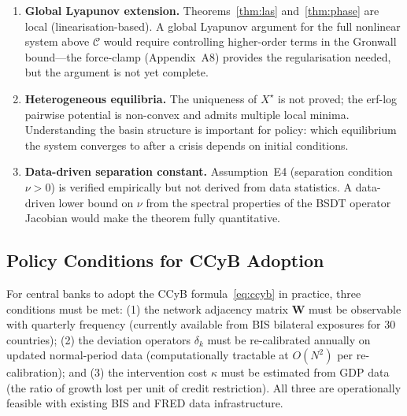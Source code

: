 \documentclass[11pt]{article}
\theoremstyle{definition}
\newcommand{\Xst}{X^{\star}}
\newcommand{\Cman}{\mathcal{C}}
\begin{document}
\begin{enumerate}
  \item \textbf{Global Lyapunov extension.}  Theorems~\ref{thm:las} and~\ref{thm:phase}
        are local (linearisation-based).  A global Lyapunov argument for the full
        nonlinear system above $\Cman$ would require controlling higher-order terms
        in the Gronwall bound---the force-clamp (Appendix~A8) provides the
        regularisation needed, but the argument is not yet complete.
  \item \textbf{Heterogeneous equilibria.}  The uniqueness of $\Xst$ is not proved;
        the erf-log pairwise potential is non-convex and admits multiple local minima.
        Understanding the basin structure is important for policy: which equilibrium
        the system converges to after a crisis depends on initial conditions.
  \item \textbf{Data-driven separation constant.}  Assumption~E4 (separation condition
        $\nu > 0$) is verified empirically but not derived from data statistics.
        A data-driven lower bound on $\nu$ from the spectral properties of the
        BSDT operator Jacobian would make the theorem fully quantitative.
\end{enumerate}

\subsection{Policy Conditions for CCyB Adoption}

For central banks to adopt the CCyB formula~\eqref{eq:ccyb} in practice, three
conditions must be met: (1) the network adjacency matrix $\mathbf{W}$ must be
observable with quarterly frequency (currently available from BIS bilateral
exposures for 30 countries); (2) the deviation operators $\delta_k$ must be
re-calibrated annually on updated normal-period data (computationally tractable
at $O(N^2)$ per re-calibration); and (3) the intervention cost $\kappa$ must be
estimated from GDP data (the ratio of growth lost per unit of credit restriction).
All three are operationally feasible with existing BIS and FRED data infrastructure.
\end{document}

